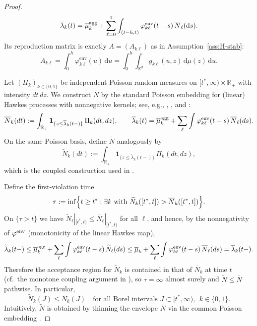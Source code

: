 \documentclass{statsoc}
\newcommand{\dd}{\mathrm{d}}
\newcommand{\bbR}{\mathbb{R}}
\newcommand{\1}{\mathbbm{1}}
\begin{document}
\begin{proof}
\[
  \overline\lambda_k(t)
  = \overline\mu_k^{\rm agg}
    + \sum_{\ell=0}^1 \int_{(t-h,t)}
           \varphi^{\mathrm{env}}_{k\ell}(t-s)\,\overline N_\ell(\dd s).
\]
Its reproduction matrix is exactly $A=(A_{k\ell})$ as in Assumption~\ref{ass:H-stab}:
\[
  A_{k\ell}
  = \int_0^h \varphi^{\mathrm{env}}_{k\ell}(u)\,\dd u
  = \int_0^h\int_{\bbR^d} g_{k\ell}(u,z)\,\dd\mu(z)\,\dd u.
\]

Let $(\Pi_k)_{k\in\{0,1\}}$ be independent Poisson random measures on $[t^\ast,\infty)\times\mathbb{R}_+$ with intensity $dt\,dz$. We construct $\overline N$ by the standard Poisson embedding for (linear) Hawkes processes with nonnegative kernels; see, e.g., \cite[Proposition~14.7.I]{daley2007introduction}, \citet[Section~3]{bremaud1996stability}, and \citet{bremaud2002rate}:
\[
  \overline N_k(dt)
  :=\int_{\mathbb{R}_+}\mathbf 1_{\{z\le \overline\lambda_k(t-)\}}\,
  \Pi_k(dt,dz),
  \qquad
  \overline\lambda_k(t)
  =\overline\mu_k^{\rm agg}+\sum_\ell\int \varphi^{\rm env}_{k\ell}(t-s)\,\overline N_\ell(ds).
\]
On the same Poisson basis, define $\widetilde N$ analogously by
\[
  \widetilde N_k(dt)
  :=\int_{\mathbb{R}_+}\mathbf 1_{\{z\le \widetilde\lambda_k(t-)\}}\,
  \Pi_k(dt,dz),
\]
which is the coupled construction used in \cite[Lemma~3]{bremaud1996stability}.

Define the first-violation time
\[
  \tau:=\inf\Bigl\{t\ge t^\ast:\exists k \text{ with }\widetilde N_k([t^\ast,t])>\overline N_k([t^\ast,t])\Bigr\}.
\]
On $\{\tau>t\}$ we have $\widetilde N_\ell|_{[t^\ast,t)}\le \overline N_\ell|_{[t^\ast,t)}$ for all $\ell$, and hence, by the nonnegativity of $\varphi^{\rm env}$ (monotonicity of the linear Hawkes map),
\[
  \widetilde\lambda_k(t-)
  \le \overline\mu_k^{\rm agg}+\sum_\ell \int \varphi^{\rm env}_{k\ell}(t-s)\,\widetilde N_\ell(ds)
  \le \overline\mu_k+\sum_\ell\int \varphi^{\rm env}_{k\ell}(t-s)\,\overline N_\ell(ds)
  =\overline\lambda_k(t-).
\]
Therefore the acceptance region for $\widetilde N_k$ is contained in that of $\overline N_k$ at time $t$ (cf.\ the monotone coupling argument in \citet{bremaud1996stability}), so $\tau=\infty$ almost surely and $\widetilde N\le \overline N$ pathwise. In particular,
\begin{equation}\label{eq:env-domination-app}
  \widetilde N_k(J)\le \overline N_k(J)
  \quad\text{for all Borel intervals }J\subset[t^\ast,\infty),\ \ k\in\{0,1\}.
\end{equation}
Intuitively, $\widetilde N$ is obtained by thinning the envelope $\overline N$ via the common Poisson embedding \cite[Proposition~14.7.I]{daley2007introduction}.



\end{proof}
\end{document}
